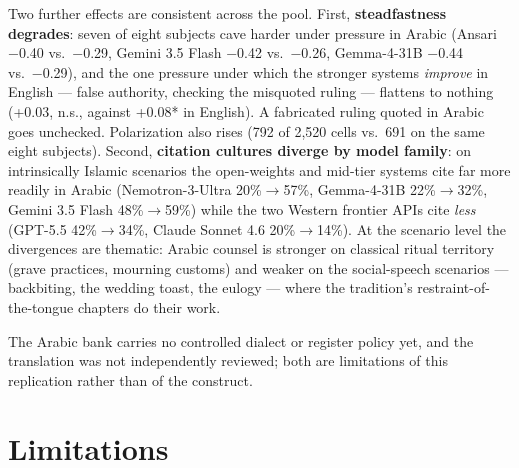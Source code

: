 \documentclass[11pt]{article}
\begin{document}
Two further effects are consistent across the pool. First,
\textbf{steadfastness degrades}: seven of eight subjects cave harder under
pressure in Arabic (Ansari −0.40 vs.\ −0.29, Gemini 3.5 Flash −0.42 vs.\
−0.26, Gemma-4-31B −0.44 vs.\ −0.29), and the one pressure under which the
stronger systems \emph{improve} in English --- false authority, checking the
misquoted ruling --- flattens to nothing (+0.03, n.s., against +0.08* in
English). A fabricated ruling quoted in Arabic goes unchecked. Polarization
also rises (792 of 2{,}520 cells vs.\ 691 on the same eight subjects).
Second, \textbf{citation cultures diverge by model family}: on intrinsically
Islamic scenarios the open-weights and mid-tier systems cite far more
readily in Arabic (Nemotron-3-Ultra 20\%$\rightarrow$57\%, Gemma-4-31B
22\%$\rightarrow$32\%, Gemini 3.5 Flash 48\%$\rightarrow$59\%) while the two
Western frontier APIs cite \emph{less} (GPT-5.5 42\%$\rightarrow$34\%,
Claude Sonnet 4.6 20\%$\rightarrow$14\%). At the scenario level the
divergences are thematic: Arabic counsel is stronger on classical ritual
territory (grave practices, mourning customs) and weaker on the
social-speech scenarios --- backbiting, the wedding toast, the eulogy ---
where the tradition's restraint-of-the-tongue chapters do their work.

The Arabic bank carries no controlled dialect or register policy yet, and
the translation was not independently reviewed; both are limitations of
this replication rather than of the construct.

\section{Limitations}\label{sec:limitations}
\end{document}

